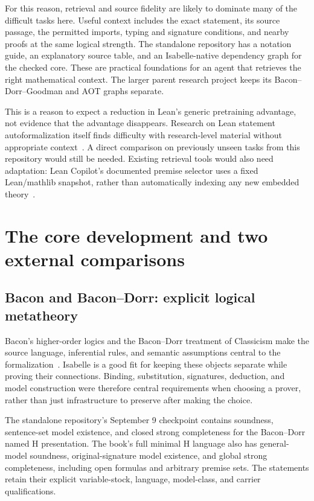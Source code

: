 \documentclass[12pt,leqno]{article}
\begin{document}
For this reason, retrieval and source fidelity are likely to dominate many
of the difficult tasks here. Useful context includes the exact statement,
its source passage, the permitted imports, typing and signature conditions,
and nearby proofs at the same logical strength. The standalone repository has a notation guide, an explanatory source
table, and an Isabelle-native dependency graph for the checked core.
These are practical foundations for an agent that retrieves the right
mathematical context. The larger parent research project keeps its
Bacon--Dorr--Goodman and AOT graphs separate.

This is a reason to expect a reduction in Lean's generic pretraining
advantage, not evidence that the advantage disappears. Research on Lean
statement autoformalization itself finds difficulty with research-level
material without appropriate context~\cite{evaluation}. A direct comparison
on previously unseen tasks from this repository would still be needed.
Existing retrieval tools would also need adaptation: Lean Copilot's documented
premise selector uses a fixed Lean/mathlib snapshot, rather than automatically
indexing any new embedded theory~\cite{copilot}.

\section{The core development and two external comparisons}

\subsection{Bacon and Bacon--Dorr: explicit logical metatheory}

Bacon's higher-order logics and the Bacon--Dorr treatment of Classicism make
the source language, inferential rules, and semantic assumptions central to
the formalization~\cite{bacon,dorr}. Isabelle is a good fit for keeping these
objects separate while proving their connections. Binding, substitution,
signatures, deduction, and model construction were therefore central
requirements when choosing a prover, rather than just infrastructure to
preserve after making the choice.

The standalone repository's September 9 checkpoint contains soundness,
sentence-set model existence, and closed strong completeness for the
Bacon--Dorr named H presentation. The book's full minimal H language also
has general-model soundness, original-signature model existence, and global
strong completeness, including open formulas and arbitrary premise sets.
The statements retain their explicit variable-stock, language, model-class,
and carrier qualifications.
\end{document}
